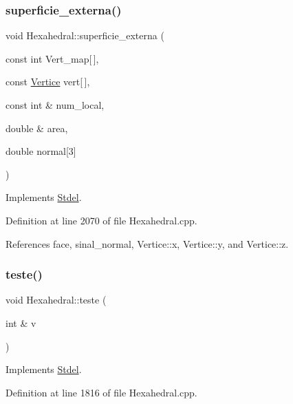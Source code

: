 \subsubsection{\texorpdfstring{superficie\+\_\+externa()}{superficie\_externa()}\hspace{0.1cm}{\footnotesize\ttfamily [2/2]}}
{\footnotesize\ttfamily void Hexahedral\+::superficie\+\_\+externa (\begin{DoxyParamCaption}\item[{const int}]{Vert\+\_\+map\mbox{[}$\,$\mbox{]},  }\item[{const \hyperlink{structVertice}{Vertice}}]{vert\mbox{[}$\,$\mbox{]},  }\item[{const int \&}]{num\+\_\+local,  }\item[{double \&}]{area,  }\item[{double}]{normal\mbox{[}3\mbox{]} }\end{DoxyParamCaption})\hspace{0.3cm}{\ttfamily [virtual]}}



Implements \hyperlink{classStdel_a4e4aa3bbd0299054ec5447bd73efc6a0}{Stdel}.



Definition at line 2070 of file Hexahedral.\+cpp.



References face, sinal\+\_\+normal, Vertice\+::x, Vertice\+::y, and Vertice\+::z.

\mbox{\label{classHexahedral_adc767ec026a292f3d434e825779bf51a}} 
\subsubsection{\texorpdfstring{teste()}{teste()}}
{\footnotesize\ttfamily void Hexahedral\+::teste (\begin{DoxyParamCaption}\item[{int \&}]{v }\end{DoxyParamCaption})\hspace{0.3cm}{\ttfamily [virtual]}}



Implements \hyperlink{classStdel_ae62bc70bb31e48d165593ed1ecd482f8}{Stdel}.



Definition at line 1816 of file Hexahedral.\+cpp.

